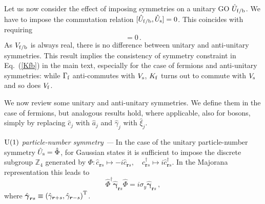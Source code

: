 \documentclass[prl,twocolumn,preprintnumbers,superscriptaddress,amsmath,amssymb]{revtex4-1}
\begin{document}
Let us now consider the effect of imposing symmetries on a unitary GO $\hat U_{\rm f/b}$. We have to impose the commutation relation $[\hat U_{\rm f/b},\hat U_{\rm s}]=0$. This coincides with requiring 
\begin{equation}
    [V_{\rm f/b},V_{\rm s}]=0\,.
\end{equation}
As $V_{\rm f/b}$ is always real, there is no difference between unitary and anti-unitary symmetries. This result implies the consistency of symmetry constraint in Eq.~(\ref{Kfb}) in the main text, especially for the case of fermions and anti-unitary symmetries: while $\Gamma_{\rm f}$ anti-commutes with $V_{\rm s}$, $K_{\rm f}$ turns out to commute with $V_{\rm s}$ and so does $V_{\rm f}$.

We now review some unitary and anti-unitary symmetries. We define them in the case of fermions, but analogous results hold, where applicable, also for bosons, simply by replacing $\hat c_j$ with $\hat a_j$ and $\hat \gamma_j$ with $\hat \xi_j$.

\emph{${\rm U}(1)$ particle-number symmetry ---} In the case of the unitary particle-number symmetry $\hat U_{\rm s}=\hat \Phi$, for Gaussian states it is sufficient to impose the discrete subgroup $\mathbb{Z}_4$ generated by $\Phi: \hat c_{\boldsymbol{r}s}\mapsto -i \hat c_{\boldsymbol{r}s}, \quad \hat c^\dag_{\boldsymbol{r}s}\mapsto i \hat c^\dag_{\boldsymbol{r}s}$. In the Majorana representation this leads to
\begin{equation}
\hat\Phi^\dag\hat{\boldsymbol{\gamma}}_{\boldsymbol{r}s} \hat\Phi = i\sigma_y \hat{\boldsymbol{\gamma}}_{\boldsymbol{r}s} \,,
\end{equation}
where $\hat{\boldsymbol{\gamma}}_{\boldsymbol{r}s}\equiv \left(\hat\gamma_{\boldsymbol{r}+s},\hat\gamma_{\boldsymbol{r}-s}\right)^{\rm T}$.
\end{document}
